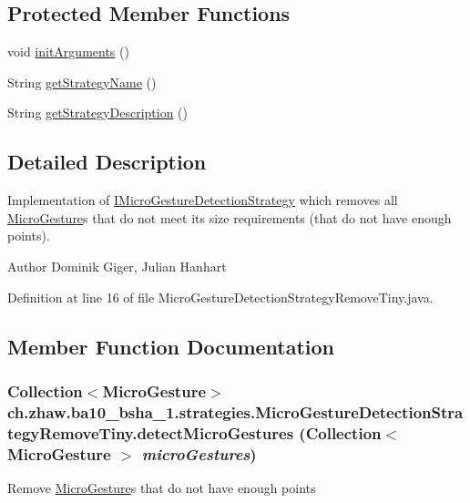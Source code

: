 \subsection*{Protected Member Functions}
\begin{DoxyCompactItemize}
\item 
void \hyperlink{classch_1_1zhaw_1_1ba10__bsha__1_1_1strategies_1_1MicroGestureDetectionStrategyRemoveTiny_a610257a043f76cbc8b9a886e5efb8135}{initArguments} ()
\item 
String \hyperlink{classch_1_1zhaw_1_1ba10__bsha__1_1_1strategies_1_1MicroGestureDetectionStrategyRemoveTiny_a95ac0cb1ddbc1a667e2b5c2dd05dbcdf}{getStrategyName} ()
\item 
String \hyperlink{classch_1_1zhaw_1_1ba10__bsha__1_1_1strategies_1_1MicroGestureDetectionStrategyRemoveTiny_a4b884732838b849076ba7563111496d2}{getStrategyDescription} ()
\end{DoxyCompactItemize}


\subsection{Detailed Description}
Implementation of \hyperlink{interfacech_1_1zhaw_1_1ba10__bsha__1_1_1strategies_1_1IMicroGestureDetectionStrategy}{IMicroGestureDetectionStrategy} which removes all \hyperlink{}{MicroGesture}s that do not meet its size requirements (that do not have enough points).

\begin{DoxyAuthor}{Author}
Dominik Giger, Julian Hanhart 
\end{DoxyAuthor}


Definition at line 16 of file MicroGestureDetectionStrategyRemoveTiny.java.

\subsection{Member Function Documentation}
\hypertarget{classch_1_1zhaw_1_1ba10__bsha__1_1_1strategies_1_1MicroGestureDetectionStrategyRemoveTiny_a3a51833545b6e87173dbacf505e44359}{
\subsubsection[{detectMicroGestures}]{\setlength{\rightskip}{0pt plus 5cm}Collection$<${\bf MicroGesture}$>$ ch.zhaw.ba10\_\-bsha\_\-1.strategies.MicroGestureDetectionStrategyRemoveTiny.detectMicroGestures (Collection$<$ {\bf MicroGesture} $>$ {\em microGestures})}}
\label{classch_1_1zhaw_1_1ba10__bsha__1_1_1strategies_1_1MicroGestureDetectionStrategyRemoveTiny_a3a51833545b6e87173dbacf505e44359}
Remove \hyperlink{}{MicroGesture}s that do not have enough points


